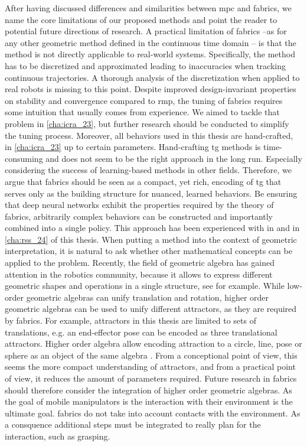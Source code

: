 After having discussed differences and similarities between
\ac{mpc} and \ac{fabrics}, we name the core limitations of
our proposed methods and point the reader to potential
future directions of research. 
A practical limitation of \ac{fabrics} --as for any other
geometric method defined in the continuous time domain --
is that the method is not directly applicable to real-world
systems. Specifically, the method has to be discretized and
approximated leading to inaccuracies when tracking continuous
trajectories. A thorough analysis of the discretization
when applied to real robots is missing to this point.
Despite improved design-invariant properties on stability
and convergence compared to \ac{rmp}, the tuning of \ac{fabrics} requires some
intuition that usually comes from experience. We aimed to
tackle that problem in \cref{cha:icra_23}, but further
research should be conducted to simplify the tuning process.
Moreover, all behaviors used in this thesis are
hand-crafted, in \cref{cha:icra_23} up to certain
parameters. Hand-crafting \ac{tg} methods is time-consuming
and does not seem to be the right approach in the long run.
Especially considering the success of learning-based methods
in other fields. Therefore, we argue that \ac{fabrics}
should be seen as a compact, yet rich, encoding of
\ac{tg} that serves only as the building structure for
nuanced, learned behaviors. Be ensuring that deep neural
networks exhibit the properties required by the theory of 
\ac{fabrics}, arbitrarily complex behaviors can be
constructed and importantly combined into a single policy.
This approach has been experienced with in \cite{xie2023neural}
and in \cref{cha:rss_24} of this thesis.
When putting a method into the context of geometric
interpretation, it is natural to ask whether other
mathematical concepts can be applied to the problem.
Recently, the field of geometric algebra has gained 
attention in the robotics community, because it allows
to express different geometric shapes and operations in a
single structure, see \cite{low2023geometric} for example.
While low-order geometric algebras can unify translation and
rotation, higher order geometric algebras can be used to unify
different attractors, as they are required by \ac{fabrics}.
For example, attractors in this thesis are limited to
sets of translations, e.g. an end-effector pose can be
encoded as three translational attractors. Higher order
algebra allow encoding attraction to a circle, line, pose
or sphere as an object of the same algebra \cite{low2023geometric}.
From a conceptional point of view, this seems the more
compact understanding of attractors, and from a practical
point of view, it reduces the amount of parameters required.
Future research in \ac{fabrics} should therefore consider
the integration of higher order geometric algebras.
As the goal of mobile manipulators is the interaction with
their environment is the ultimate goal. \Ac{fabrics} do not
take into account contacts with the environment. As a
consquence additional steps must be integrated to really
plan for the interaction, such as grasping.





